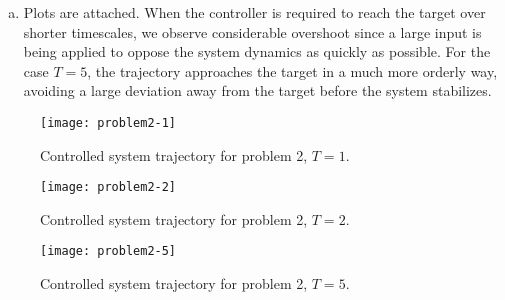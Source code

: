 \documentclass{article}
\begin{document}
\begin{enumerate}[(a)]
{%
%
  }
  \item{
    Plots are attached. When the controller is required to reach the
    target over shorter timescales, we observe considerable overshoot
    since a large input is being applied to oppose the system dynamics
    as quickly as possible. For the case $T = 5$, the trajectory
    approaches the target in a much more orderly way, avoiding a large
    deviation away from the target before the system stabilizes.
  }
\end{enumerate}

\clearpage
\begin{figure}[h]
  \texttt{[image: problem2-1]}
  \caption{Controlled system trajectory for problem 2, $T = 1$.}
\end{figure}
\begin{figure}[h]
  \texttt{[image: problem2-2]}
  \caption{Controlled system trajectory for problem 2, $T = 2$.}
\end{figure}
\begin{figure}[h]
  \texttt{[image: problem2-5]}
  \caption{Controlled system trajectory for problem 2, $T = 5$.}
\end{figure}

\pagebreak
\end{document}
